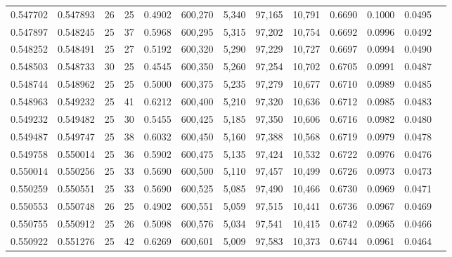 \begin{tabular}{rrrrrrrrrrrrr}
0.547702 & 0.547893 &    26 &  25 &                                     0.4902 & 600,270 &   5,340 &  97,165 &  10,791 & 0.6690 & 0.1000 & 0.0495 \\
0.547897 & 0.548245 &    25 &  37 &                                     0.5968 & 600,295 &   5,315 &  97,202 &  10,754 & 0.6692 & 0.0996 & 0.0492 \\
0.548252 & 0.548491 &    25 &  27 &                                     0.5192 & 600,320 &   5,290 &  97,229 &  10,727 & 0.6697 & 0.0994 & 0.0490 \\
0.548503 & 0.548733 &    30 &  25 &                                     0.4545 & 600,350 &   5,260 &  97,254 &  10,702 & 0.6705 & 0.0991 & 0.0487 \\
0.548744 & 0.548962 &    25 &  25 &                                     0.5000 & 600,375 &   5,235 &  97,279 &  10,677 & 0.6710 & 0.0989 & 0.0485 \\
0.548963 & 0.549232 &    25 &  41 &                                     0.6212 & 600,400 &   5,210 &  97,320 &  10,636 & 0.6712 & 0.0985 & 0.0483 \\
0.549232 & 0.549482 &    25 &  30 &                                     0.5455 & 600,425 &   5,185 &  97,350 &  10,606 & 0.6716 & 0.0982 & 0.0480 \\
0.549487 & 0.549747 &    25 &  38 &                                     0.6032 & 600,450 &   5,160 &  97,388 &  10,568 & 0.6719 & 0.0979 & 0.0478 \\
0.549758 & 0.550014 &    25 &  36 &                                     0.5902 & 600,475 &   5,135 &  97,424 &  10,532 & 0.6722 & 0.0976 & 0.0476 \\
0.550014 & 0.550256 &    25 &  33 &                                     0.5690 & 600,500 &   5,110 &  97,457 &  10,499 & 0.6726 & 0.0973 & 0.0473 \\
0.550259 & 0.550551 &    25 &  33 &                                     0.5690 & 600,525 &   5,085 &  97,490 &  10,466 & 0.6730 & 0.0969 & 0.0471 \\
0.550553 & 0.550748 &    26 &  25 &                                     0.4902 & 600,551 &   5,059 &  97,515 &  10,441 & 0.6736 & 0.0967 & 0.0469 \\
0.550755 & 0.550912 &    25 &  26 &                                     0.5098 & 600,576 &   5,034 &  97,541 &  10,415 & 0.6742 & 0.0965 & 0.0466 \\
0.550922 & 0.551276 &    25 &  42 &                                     0.6269 & 600,601 &   5,009 &  97,583 &  10,373 & 0.6744 & 0.0961 & 0.0464 \\

\end{tabular}
